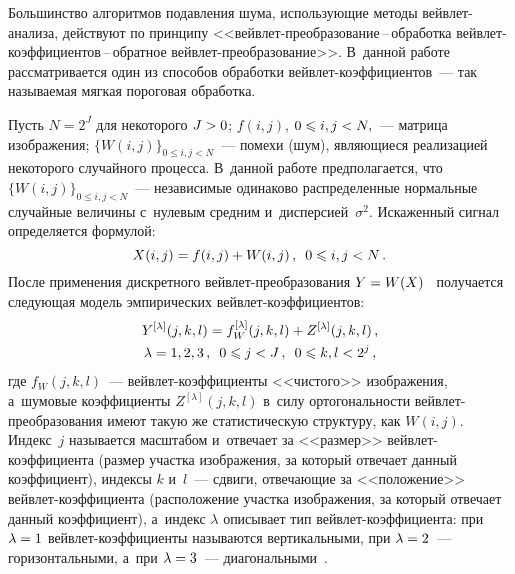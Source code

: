 \begin{multicols}{2}
Большинство алгоритмов подавления шума, использующие методы вейв\-лет-ана\-ли\-за, 
действуют по принципу 
<<вейв\-лет-пре\-об\-ра\-зо\-ва\-ние\,--\,обработка вейв\-лет-ко\-эф\-фи\-ци\-ен\-тов\,--\,об\-рат\-ное 
вейв\-лет-пре\-об\-ра\-зо\-ва\-ние>>. В~данной работе рассматривается один из 
способов обработки вейв\-лет-ко\-эф\-фи\-ци\-ен\-тов~--- 
так называемая мягкая пороговая обработка.

Пусть $N=2^J$ для некоторого $J\hm>0$; $f(i,j)$, $0\hm\leqslant i,j \hm< N,$~--- 
матрица изображения; $\{W(i,j)\}_{0\leqslant i,j < N}$~--- 
помехи (шум), являющиеся реализацией некоторого
случайного процесса. В~данной работе предполагается, 
что $\{W(i,j)\}_{0\leqslant i,j < N}$~--- независимые
одинаково распределенные нормальные случайные величины с~нулевым 
средним и~дисперсией~$\sigma^2$. Искаженный
сигнал определяется формулой:
\begin{equation*}
    X(i,j)=f(i,j)+W(i,j)\,, \enskip 0 \leqslant i,j < N\,.
\end{equation*}
После применения дискретного вейв\-лет-пре\-об\-ра\-зо\-ва\-ния 
$Y\hm=W(X)$~\cite{posobie} 
получается следующая модель эмпирических вейв\-лет-ко\-эф\-фи\-ци\-ентов:
\begin{multline*}
    Y^{[\lambda]}(j,k,l)=f^{[\lambda]}_W(j,k,l)+
    Z^{[\lambda]}(j,k,l)\,, \\ 
    \lambda=1,2,3\,,\enskip 0\leqslant j<J\,,\enskip 0\leqslant k,l< 2^j\,,
\end{multline*}
где $f_W(j,k,l)$~--- вейвлет-ко\-эф\-фи\-ци\-ен\-ты <<чис\-то\-го>> изображения, 
а~шумовые коэффициенты $Z^{[\lambda]}(j,k,l)$ в~силу ортогональности 
вейв\-лет-пре\-об\-ра\-зо\-ва\-ния имеют такую же статистическую структуру, 
как $W(i,j)$. Индекс~$j$ называется масштабом и~отвечает за <<размер>> 
вейв\-лет-ко\-эф\-фи\-ци\-ен\-та (размер участка изображения, за который 
отвечает данный коэффициент), индексы $k$ и~$l$~--- сдвиги, отвечающие за 
<<положение>> вейв\-лет-ко\-эф\-фи\-ци\-ен\-та (расположение участка изображения, 
за который отвечает данный коэффициент), а~индекс $\lambda$ описывает тип 
вейв\-лет-ко\-эф\-фи\-ци\-ен\-та: при $\lambda\hm=1$ 
вейв\-лет-ко\-эф\-фи\-ци\-ен\-ты называются вертикальными, при $\lambda\hm=2$~--- 
горизонтальными, а~при $\lambda\hm=3$~--- диагональными~\cite{smolentsev, bogges, malla}.



\end{multicols}
